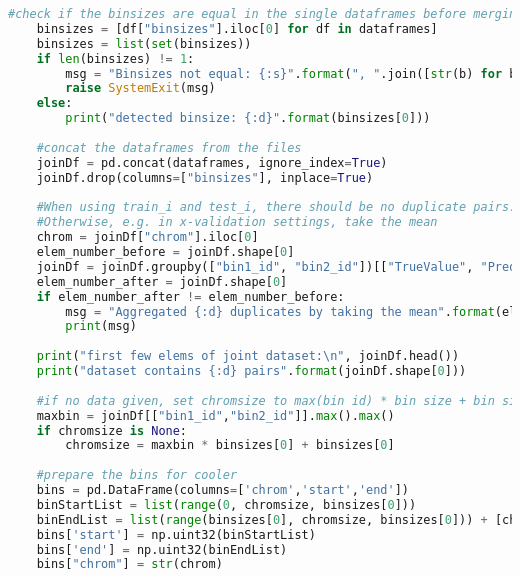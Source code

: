 \begin{lstlisting}[language=python, caption=Custom script to convert HiC-Reg's text output to cooler format, label=list:methods:hicreg2cool]
	#check if the binsizes are equal in the single dataframes before merging the dataframes
	binsizes = [df["binsizes"].iloc[0] for df in dataframes]
	binsizes = list(set(binsizes))
	if len(binsizes) != 1:
		msg = "Binsizes not equal: {:s}".format(", ".join([str(b) for b in binsizes]))
		raise SystemExit(msg)
	else:
		print("detected binsize: {:d}".format(binsizes[0])) 
	
	#concat the dataframes from the files
	joinDf = pd.concat(dataframes, ignore_index=True)
	joinDf.drop(columns=["binsizes"], inplace=True)
	
	#When using train_i and test_i, there should be no duplicate pairs. 
	#Otherwise, e.g. in x-validation settings, take the mean
	chrom = joinDf["chrom"].iloc[0]
	elem_number_before = joinDf.shape[0]
	joinDf = joinDf.groupby(["bin1_id", "bin2_id"])[["TrueValue", "PredictedValue"]].mean().reset_index()
	elem_number_after = joinDf.shape[0]
	if elem_number_after != elem_number_before:
		msg = "Aggregated {:d} duplicates by taking the mean".format(elem_number_before - elem_number_after)
		print(msg)
	
	print("first few elems of joint dataset:\n", joinDf.head())
	print("dataset contains {:d} pairs".format(joinDf.shape[0]))
	
	#if no data given, set chromsize to max(bin id) * bin size + bin size
	maxbin = joinDf[["bin1_id","bin2_id"]].max().max()
	if chromsize is None:
		chromsize = maxbin * binsizes[0] + binsizes[0]
	
	#prepare the bins for cooler
	bins = pd.DataFrame(columns=['chrom','start','end'])
	binStartList = list(range(0, chromsize, binsizes[0]))
	binEndList = list(range(binsizes[0], chromsize, binsizes[0])) + [chromsize]
	bins['start'] = np.uint32(binStartList)
	bins['end'] = np.uint32(binEndList)
	bins["chrom"] = str(chrom)


\end{lstlisting}
